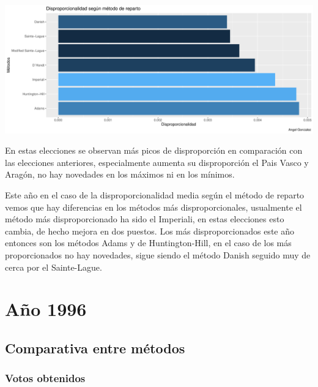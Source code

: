 \documentclass[12pt,a4paper,]{book}
\numberwithin{dummy}{section}
\theoremstyle{ocrenumbox}
\theoremstyle{blacknumex}
\theoremstyle{blacknumbox}
\theoremstyle{ocrenum}
\theoremstyle{ocrenum}
\begin{document}
\begin{center}\includegraphics[width=0.95\linewidth]{figurasR/unnamed-chunk-57-2} \end{center}

En estas elecciones se observan más picos de disproporción en
comparación con las elecciones anteriores, especialmente aumenta su
disproporción el Pais Vasco y Aragón, no hay novedades en los máximos ni
en los mínimos.

Este año en el caso de la disproporcionalidad media según el método de
reparto vemos que hay diferencias en los métodos más disproporcionales,
usualmente el método más disproporcionado ha sido el Imperiali, en estas
elecciones esto cambia, de hecho mejora en dos puestos. Los más
disproporcionados este año entonces son los métodos Adams y de
Huntington-Hill, en el caso de los más proporcionados no hay novedades,
sigue siendo el método Danish seguido muy de cerca por el Sainte-Lague.

\hypertarget{auxf1o-1996}{%
\section{Año 1996}\label{auxf1o-1996}}

\hypertarget{comparativa-entre-muxe9todos-6}{%
\subsection{Comparativa entre
métodos}\label{comparativa-entre-muxe9todos-6}}

\hypertarget{votos-obtenidos-6}{%
\subsubsection{Votos obtenidos}\label{votos-obtenidos-6}}
\end{document}

